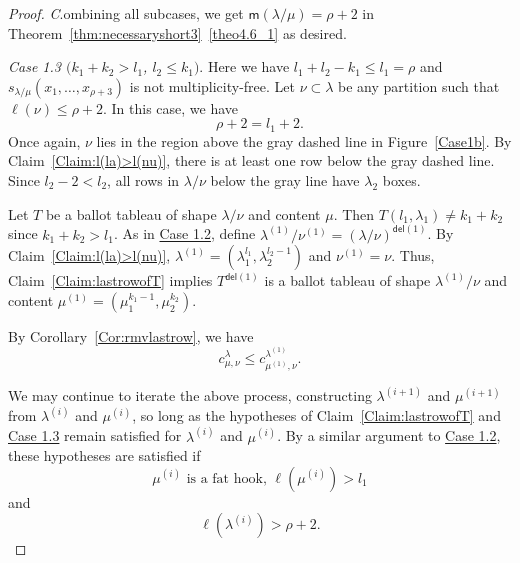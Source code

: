 \documentclass[ALCO,ThmDefs,Unicode,epreuves]{cedram}
\newcommand{\msf}{\mathsf{m}}
\newcommand{\del}{\mathsf{del}}
\let\hypertargeta\hypertarget %
\let\hyperlinka\hyperlink %
\newenvironment{Case}[1]{\par\vskip2pt\noindent%
\emph{#1}.}{\vskip2pt}
\begin{document}
\begin{proof}
\begin{Case}
Combining all subcases, we get ${\msf }(\lambda/\mu) = \rho+2$ in Theorem~\ref{thm:necessaryshort3}~\ref{theo4.6_1} as desired.
\end{Case}

\begin{Case}
{\hypertargeta{theo4.6_case1.3}{Case 1.3} $(k_1+k_2 > l_1$, $l_2 \leq k_1)$} 
Here we have $l_1+l_2-k_1 \leq l_1 = \rho$ and $s_{\lambda/\mu}(x_1,\ldots,x_{\rho+3})$ is not multiplicity-free. Let $\nu\subset \lambda$ be any partition such that $\ell(\nu)\leq \rho+2$. In this case, we have
\begin{equation}
\label{eq:case1.3rho}
\rho+2 = l_1+2.
\end{equation}
Once again, $\nu$ lies in the region above the gray dashed line in Figure~\ref{Case1b}. By Claim~\ref{Claim:l(la)>l(nu)}, there is at least one row below the gray dashed line. Since $l_2-2 < l_2$, all rows in $\lambda/\nu$ below the gray line have $\lambda_2$ boxes.

Let $T$ be a ballot tableau of shape $\lambda/\nu$ and content $\mu$. Then $T(l_1,\lambda_1)\neq k_1+k_2$ since $k_1+k_2 > l_1$. As in \hyperlinka{theo4.6_case1.2}{Case 1.2}, define $\lambda^{(1)}/ \nu^{(1)} = (\lambda / \nu)^{\del (1)}$. By Claim~\ref{Claim:l(la)>l(nu)}, $\lambda^{(1)} = (\lambda_1^{l_1},\lambda_2^{l_2-1})$ and $\nu^{(1)} = \nu$. Thus, Claim~\ref{Claim:lastrowofT} implies $T^{\del (1)}$ is a ballot tableau of shape $\lambda^{(1)}/\nu$ and content $\mu^{(1)} = (\mu_1^{k_1-1},\mu_2^{k_2})$.

By Corollary~\ref{Cor:rmvlastrow}, we have
\begin{equation}
\label{eq:firstiterationbound1.3}
c^{\lambda}_{\mu,\nu} \leq c^{\lambda^{(1)}}_{\mu^{(1)},\nu}.
\end{equation}

We may continue to iterate the above process, constructing $\lambda^{(i+1)}$ and $\mu^{(i+1)}$ from $\lambda^{(i)}$ and $\mu^{(i)}$, so long as the hypotheses of Claim~\ref{Claim:lastrowofT} and \hyperlinka{theo4.6_case1.3}{Case 1.3} remain satisfied for $\lambda^{(i)}$ and $\mu^{(i)}$. By a similar argument to \hyperlinka{theo4.6_case1.2}{Case 1.2}, these hypotheses are satisfied if
\begin{equation}\label{eqn:condition11}
 \mu^{(i)}\text{ is a fat hook, }\ell(\mu^{(i)}) > l_1
\end{equation}
and 
\begin{equation}\label{eqn:condition1b}
 \ell(\lambda^{(i)}) > \rho+2.
\end{equation}


\end{Case}
\end{proof}
\end{document}
